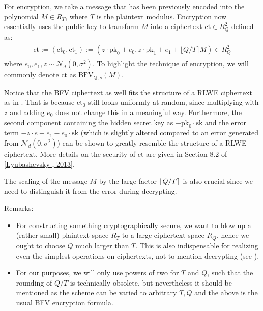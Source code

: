 \documentclass[letterpaper,10pt,english]{jupyterBook}
\begin{document}
\begin{DUlineblock}{0em}
\item[] 
\end{DUlineblock}

\sphinxAtStartPar
For encryption, we take a message that has been previously encoded into the polynomial \(M \in R_T\), where \(T\) is the plaintext modulus.
Encryption now essentially uses the public key to transform \(M\) into a ciphertext \(\mathrm{ct} \in R_Q^2\) defined as:
\begin{equation*}
\begin{split}\begin{split}
\mathrm{ct} := (\mathrm{ct}_0, \mathrm{ct}_1) := (z\cdot \mathrm{pk}_0+e_0,z\cdot \mathrm{pk}_1 + e_1 + \lfloor Q/T \rceil M) \in R_Q^2
\end{split}\end{split}
\end{equation*}
\sphinxAtStartPar
where \(e_0, e_1, z \sim \mathcal N_d(0, \sigma^2)\).
To highlight the technique of encryption, we will commonly denote \(\mathrm{ct}\) as \(\mathrm{BFV}_{Q,s}(M)\).

\sphinxAtStartPar
Notice that the BFV ciphertext as well fits the structure of a RLWE ciphertext as in {\hyperref[\detokenize{Thesis:RLWE-distribution}]{}}.
That is because \(\mathrm{ct}_0\) still looks uniformly at random, since multiplying with \(z\) and adding \(e_0\) does not change this in a meaningful way.
Furthermore, the second component containing the hidden secret key as \(- \mathrm{pk}_0 \cdot \mathrm{sk}\) and the error term \(-z \cdot e + e_1 - e_0\cdot \mathrm{sk}\) (which is slightly altered compared to an error generated from \(\mathcal N_d(0,\sigma^2)\)) can be shown to greatly resemble the structure of a RLWE ciphertext.
More details on the security of \(\mathrm{ct}\) are given in Section 8.2 of {[}\hyperlink{cite.Thesis:id71}{Lyubashevsky , 2013}{]}.

\sphinxAtStartPar
The scaling of the message \(M\) by the large factor \(\left\lfloor Q/T \right\rceil\) is also crucial since we need to distinguish it from the error during decrypting.

\sphinxAtStartPar
Remarks:
\begin{itemize}
\item {} 
\sphinxAtStartPar
For constructing something cryptographically secure, we want to blow up a (rather small) plaintext space \(R_T\) to a large ciphertext space \(R_Q\), hence we ought to choose \(Q\) much larger than \(T\).
This is also indispensable for realizing even the simplest operations on ciphertexts, not to mention decrypting (see {\hyperref[\detokenize{Thesis:correct-BFV-decryption}]{}}).

\item {} 
\sphinxAtStartPar
For our purposes, we will only use powers of two for \(T\) and \(Q\), such that the rounding of \(Q/T\) is technically obsolete, but nevertheless it should be mentioned as the scheme can be varied to arbitrary \(T, Q\) and the above is the usual BFV encryption formula.

\end{itemize}
\end{document}

